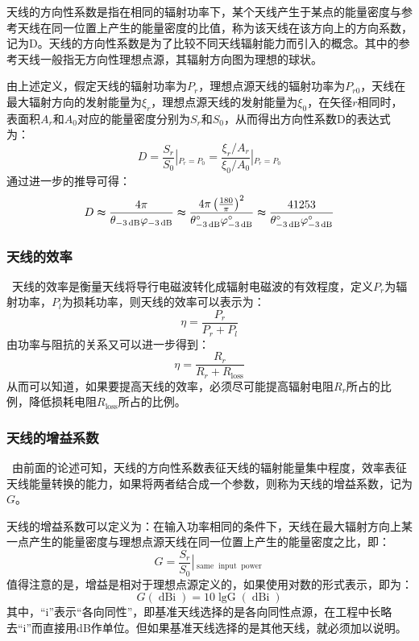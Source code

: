 \documentclass{article}
\newcommand{\tmop}[1]{\ensuremath{\operatorname{#1}}}
\begin{document}
天线的方向性系数是指在相同的辐射功率下，某个天线产生于某点的能量密度与参考天线在同一位置上产生的能量密度的比值，称为该天线在该方向上的方向系数，记为D。天线的方向性系数是为了比较不同天线辐射能力而引入的概念。其中的参考天线一般指无方向性理想点源，其辐射方向图为理想的球状。

由上述定义，假定天线的辐射功率为$P_r$，理想点源天线的辐射功率为$P_{r
0}$，天线在最大辐射方向的发射能量为$\xi_r$，理想点源天线的发射能量为$\xi_0$，在矢径$r$相同时，表面积$A_r$和$A_0$对应的能量密度分别为$S_r$和$S_0$，从而得出方向性系数D的表达式为：
\[ D = \frac{S_r}{S_0} \left|_{P_r = P_0} \right. = \frac{\xi_r / A_r}{\xi_0 /
   A_0} \left|_{P_r = P_0} \right. \]
通过进一步的推导可得：
\[ D \thickapprox \frac{4 \pi}{\theta_{- 3 \tmop{dB}} \varphi_{- 3 \tmop{dB}}}
   \thickapprox \frac{4 \pi \left( \frac{180}{\pi}
   \right)^2}{\theta^{\circ}_{- 3 \tmop{dB}} \varphi^{\circ}_{- 3 \tmop{dB}}}
   \thickapprox \frac{41253}{\theta^{\circ}_{- 3 \tmop{dB}} \varphi^{\circ}_{-
   3 \tmop{dB}}} \]

\subsubsection{天线的效率}

\
天线的效率是衡量天线将导行电磁波转化成辐射电磁波的有效程度，定义$P_r$为辐射功率，$P_l$为损耗功率，则天线的效率可以表示为：
\[ \eta = \frac{P_r}{P_r + P_l} \]
由功率与阻抗的关系又可以进一步得到：
\[ \eta = \frac{R_r}{R_r + R_{\tmop{loss}}} \]
从而可以知道，如果要提高天线的效率，必须尽可能提高辐射电阻$R_r$所占的比例，降低损耗电阻$R_{\tmop{loss}}$所占的比例。

\subsubsection{天线的增益系数}

\
由前面的论述可知，天线的方向性系数表征天线的辐射能量集中程度，效率表征天线能量转换的能力，如果将两者结合成一个参数，则称为天线的增益系数，记为$G$。

天线的增益系数可以定义为：在输入功率相同的条件下，天线在最大辐射方向上某一点产生的能量密度与理想点源天线在同一位置上产生的能量密度之比，即：
\[ G = \frac{S_r}{S_0} \left|_{\tmop{same} \tmop{input} \tmop{power}} \right.
\]
值得注意的是，增益是相对于理想点源定义的，如果使用对数的形式表示，即为：
\[ G \left( \tmop{dBi} \right) = 10 \tmop{lgG} \left( \tmop{dBi} \right) \]
其中，“i”表示“各向同性”，即基准天线选择的是各向同性点源，在工程中长略去“i”而直接用dB作单位。但如果基准天线选择的是其他天线，就必须加以说明。
\end{document}
